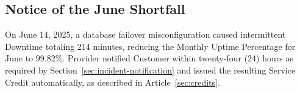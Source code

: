 \subsection{Notice of the June Shortfall}
On June 14, 2025, a database failover misconfiguration caused intermittent Downtime totaling 214 minutes, reducing the Monthly Uptime Percentage for June to 99.82\%. Provider notified Customer within twenty-four (24) hours as required by Section~\ref{sec:incident-notification} and issued the resulting Service Credit automatically, as described in Article~\ref{sec:credits}.
